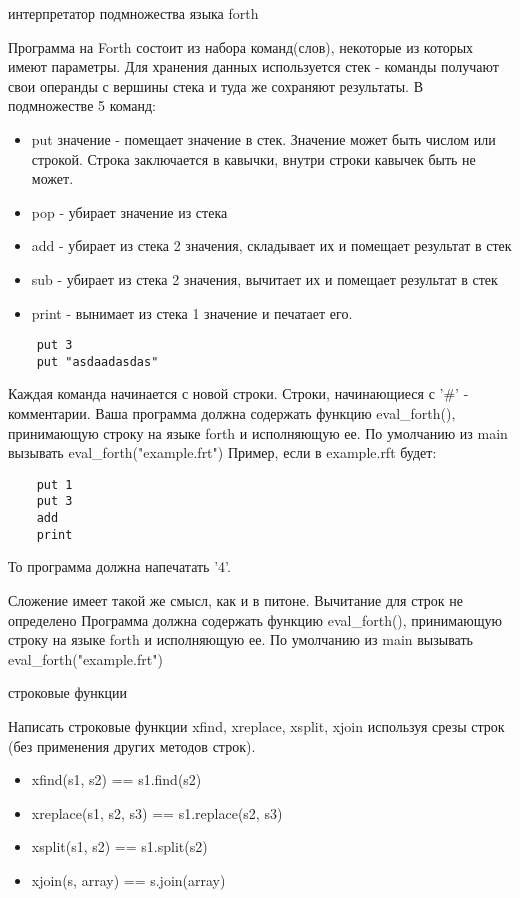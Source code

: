 \documentclass{article}
\begin{document}

\begin{center} интерпретатор подмножества языка forth \end{center}

      Программа на Forth состоит из набора команд(слов),
      некоторые из которых имеют параметры. Для хранения данных используется стек -
      команды получают свои операнды с вершины стека и туда же сохраняют результаты.
      В  подмножестве 5 команд:

\begin{itemize}
    \item put значение - помещает значение в стек. Значение может
          быть числом или строкой. Строка заключается в кавычки, внутри
          строки кавычек быть не может.
    \item pop - убирает значение из стека
    \item add - убирает из стека 2 значения, складывает их и помещает результат в стек
    \item sub - убирает из стека 2 значения, вычитает их и помещает результат в стек
    \item print - вынимает из стека 1 значение и печатает его.
\end{itemize}


\begin{lstlisting}
    put 3
    put "asdaadasdas"
\end{lstlisting}

    Каждая команда начинается с новой строки. Строки, начинающиеся с '\#' - комментарии.
    Ваша программа должна содержать функцию eval\_forth(), принимающую строку на языке
    forth и исполняющую ее. По умолчанию из main вызывать eval\_forth("example.frt")
    Пример, если в example.rft будет:

\begin{lstlisting}
    put 1
    put 3
    add
    print
\end{lstlisting}

    То программа должна напечатать '4'. 

    Сложение имеет такой же смысл, как и в питоне. Вычитание для строк не определено
    Программа должна содержать функцию eval\_forth(), принимающую строку на языке forth и исполняющую ее. 
    По умолчанию из main вызывать eval\_forth("example.frt")
\newpage

\begin{center} строковые функции \end{center}
Написать строковые функции xfind, xreplace, xsplit, xjoin используя
срезы строк (без применения других методов строк).
\begin{itemize}
    \item xfind(s1, s2) == s1.find(s2)
    \item xreplace(s1, s2, s3) == s1.replace(s2, s3)
    \item xsplit(s1, s2) == s1.split(s2)
    \item xjoin(s, array) == s.join(array)
\end{itemize}
\newpage
\end{document}
